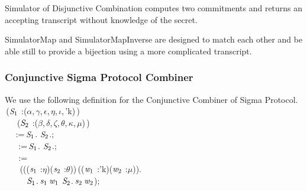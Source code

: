 Simulator of Disjunctive Combination computes two commitments and returns an accepting transcript without knowledge of the secret. 

SimulatorMap and SimulatorMapInverse are designed to match each other and be able still to 
provide a bijection using a more complicated transcript.\\
\subsubsection{Conjunctive Sigma Protocol Combiner}
We use the following definition for the Conjunctive Combiner of Sigma Protocol. \\
\HOLTokenTurnstile{}\,(\ensuremath{\HOLFreeVar{S}\sb{\mathrm{1}}} :(\ensuremath{\alpha},\,\ensuremath{\gamma},\,\ensuremath{\epsilon},\,\ensuremath{\eta},\,\ensuremath{\iota},\,'k)\,)\\
\,\,\,\,\,\,\,\,\,(\ensuremath{\HOLFreeVar{S}\sb{\mathrm{2}}} :(\ensuremath{\beta},\,\ensuremath{\delta},\,\ensuremath{\zeta},\,\ensuremath{\theta},\,\ensuremath{\kappa},\,\ensuremath{\mu})\,)\,\HOLSymConst{=}\\
\,\,\,\,\,\,\,\HOLTokenLeftrec{}\,:=\,\ensuremath{\HOLFreeVar{S}\sb{\mathrm{1}}}.\,\HOLSymConst{\ensuremath{\times}}\,\ensuremath{\HOLFreeVar{S}\sb{\mathrm{2}}}.;\\
\,\,\,\,\,\,\,\,\,\,:=\,\ensuremath{\HOLFreeVar{S}\sb{\mathrm{1}}}.\,\HOLSymConst{\ensuremath{\times}}\,\ensuremath{\HOLFreeVar{S}\sb{\mathrm{2}}}.;\\
\,\,\,\,\,\,\,\,\,\,:=\\
\,\,\,\,\,\,\,\,\,\,\,(\HOLTokenLambda{}((\ensuremath{\HOLBoundVar{s}\sb{\mathrm{1}}} :\ensuremath{\eta})\HOLSymConst{,}(\ensuremath{\HOLBoundVar{s}\sb{\mathrm{2}}} :\ensuremath{\theta}))\,((\ensuremath{\HOLBoundVar{w}\sb{\mathrm{1}}} :'k)\HOLSymConst{,}(\ensuremath{\HOLBoundVar{w}\sb{\mathrm{2}}} :\ensuremath{\mu})).\\
\,\,\,\,\,\,\,\,\,\,\,\,\,\,\,\,\ensuremath{\HOLFreeVar{S}\sb{\mathrm{1}}}.\,\ensuremath{\HOLBoundVar{s}\sb{\mathrm{1}}}\,\ensuremath{\HOLBoundVar{w}\sb{\mathrm{1}}}\,\HOLSymConst{\HOLTokenConj{}}\,\ensuremath{\HOLFreeVar{S}\sb{\mathrm{2}}}.\,\ensuremath{\HOLBoundVar{s}\sb{\mathrm{2}}}\,\ensuremath{\HOLBoundVar{w}\sb{\mathrm{2}}});\\
